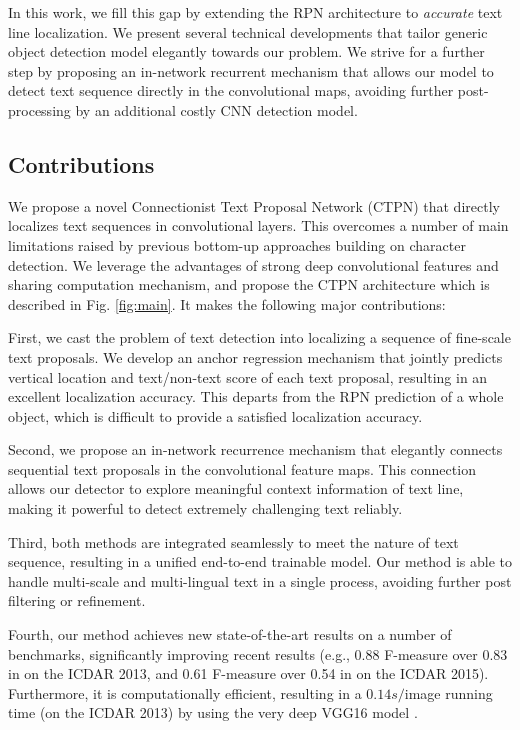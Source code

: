 \documentclass[runningheads]{llncs}
\begin{document}
In this work, we fill this gap by extending the RPN architecture \cite{Ren2015} to \textit{accurate} text line localization.  We present several technical developments that tailor generic object detection model elegantly towards our problem. We strive for a further step by proposing an in-network recurrent mechanism that allows our model to detect text sequence  directly in the convolutional maps, avoiding further post-processing by an additional costly CNN detection model.





\subsection{Contributions}
We  propose  a novel Connectionist Text Proposal Network (CTPN) that directly localizes text sequences in  convolutional layers.
This overcomes a number of main limitations raised by previous bottom-up approaches building on character detection. We leverage the advantages of  strong deep convolutional features and sharing computation mechanism, and propose the CTPN architecture which is described in Fig. \ref{fig:main}. It makes the following major contributions:


First, we cast the problem of text detection into localizing a sequence of fine-scale text proposals. We develop an anchor  regression mechanism that jointly predicts  vertical location and text/non-text score of each text proposal, resulting in  an excellent localization accuracy. This departs from the RPN prediction of a whole object, which is difficult to provide a satisfied localization accuracy.

Second, we propose an in-network recurrence mechanism that elegantly connects sequential text proposals  in the convolutional feature maps. This connection allows our detector to explore meaningful context information of text line, making it powerful to detect  extremely challenging text reliably.


Third, both methods are integrated seamlessly to meet the nature of text sequence, resulting in a unified end-to-end trainable model. Our method is able to handle multi-scale and multi-lingual text in a single process, avoiding further post filtering or refinement. 

Fourth, our method achieves new state-of-the-art results on a number of benchmarks, significantly improving recent results (e.g., 0.88 F-measure over 0.83 in \cite{Gupta2016} on the ICDAR 2013, and 0.61 F-measure over 0.54 in \cite{Zhang2016} on the ICDAR 2015). Furthermore,  it is computationally efficient, resulting in a $0.14s/$image running time (on the ICDAR 2013) by using the very deep VGG16 model \cite{Simonyan2015}.
\end{document}
